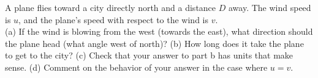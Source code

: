 A plane flies toward a city directly north and a distance
$D$ away. The wind speed is $u$, and the plane's speed with respect
to the wind is $v$.\\
%
(a) If the wind is blowing from the west (towards the east), what
direction should the plane head (what angle west of north)?\answercheck\hwendpart
%
(b) How long does it take the plane to get to the city?\answercheck\hwendpart
%
(c) Check that your answer to part b has units that make sense.\hwendpart
%
(d) Comment on the behavior of your answer in the case where $u=v$.
